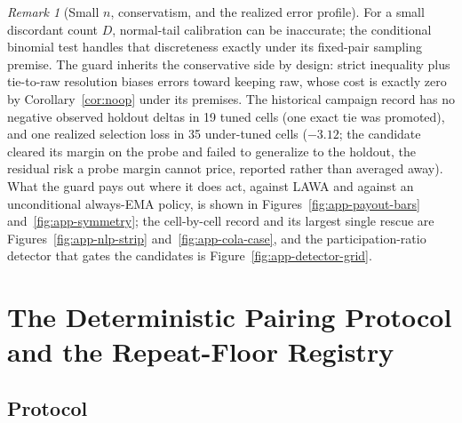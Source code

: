 \documentclass[10pt,letterpaper]{article}
\theoremstyle{remark}
\newtheorem*{remarkx}{Remark}
\begin{document}
\begin{remarkx}[Small $n$, conservatism, and the realized error profile]
For a small discordant count $D$, normal-tail calibration can be inaccurate;
the conditional binomial test handles that discreteness exactly under its
fixed-pair sampling premise. The guard inherits the conservative
side by design: strict inequality plus tie-to-raw resolution biases errors
toward keeping raw, whose cost is exactly zero by
Corollary~\ref{cor:noop} under its premises. The historical campaign record
has no negative observed holdout deltas in 19 tuned cells (one exact tie was
promoted), and one realized selection loss in 35
under-tuned cells ($-3.12$; the candidate cleared its margin on the probe and
failed to generalize to the holdout, the residual risk a probe margin
cannot price, reported rather than averaged away). What the guard pays out
where it does act, against LAWA and against an unconditional always-EMA
policy, is shown in Figures~\ref{fig:app-payout-bars} and~\ref{fig:app-symmetry}; the
cell-by-cell record and its largest single rescue are
Figures~\ref{fig:app-nlp-strip} and~\ref{fig:app-cola-case}, and the
participation-ratio detector that gates the candidates is
Figure~\ref{fig:app-detector-grid}.
\end{remarkx}

\section{The Deterministic Pairing Protocol and the Repeat-Floor
Registry}
\label{sec:protocol}

\subsection{Protocol}
\end{document}
